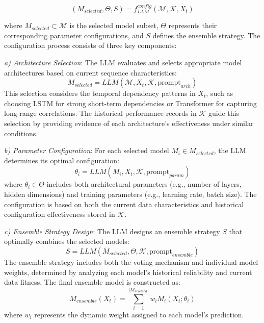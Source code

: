 \documentclass[conference]{IEEEtran}
\begin{document}
\begin{equation}
    (M_{selected}, \Theta, S) = f_{LLM}^{config}(\mathcal{M}, \mathcal{K}, X_t)
\end{equation}

where $M_{selected} \subset \mathcal{M}$ is the selected model subset, $\Theta$ represents their corresponding parameter configurations, and $S$ defines the ensemble strategy. The configuration process consists of three key components:

\textit{a) Architecture Selection}: The LLM evaluates and selects appropriate model architectures based on current sequence characteristics:
\begin{equation}
    M_{selected} = LLM(\mathcal{M}, X_t, \mathcal{K}, \text{prompt}_{arch})
\end{equation}
This selection considers the temporal dependency patterns in $X_t$, such as choosing LSTM for strong short-term dependencies or Transformer for capturing long-range correlations. The historical performance records in $\mathcal{K}$ guide this selection by providing evidence of each architecture's effectiveness under similar conditions.

\textit{b) Parameter Configuration}: For each selected model $M_i \in M_{selected}$, the LLM determines its optimal configuration:
\begin{equation}
    \theta_i = LLM(M_i, X_t, \mathcal{K}, \text{prompt}_{param})
\end{equation}
where $\theta_i \in \Theta$ includes both architectural parameters (e.g., number of layers, hidden dimensions) and training parameters (e.g., learning rate, batch size). The configuration is based on both the current data characteristics and historical configuration effectiveness stored in $\mathcal{K}$.

\textit{c) Ensemble Strategy Design}: The LLM designs an ensemble strategy $S$ that optimally combines the selected models:
\begin{equation}
    S = LLM(M_{selected}, \Theta, \mathcal{K}, \text{prompt}_{ensemble})
\end{equation}
The ensemble strategy includes both the voting mechanism and individual model weights, determined by analyzing each model's historical reliability and current data fitness. The final ensemble model is constructed as:
\begin{equation}
    M_{ensemble}(X_t) = \sum_{i=1}^{|M_{selected}|} w_i M_i(X_t; \theta_i)
\end{equation}
where $w_i$ represents the dynamic weight assigned to each model's prediction.
\end{document}
